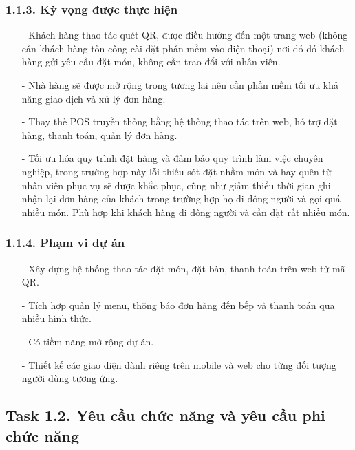 \documentclass[a4paper]{article}
\begin{document}
\subsubsection{1.1.3. Kỳ vọng được thực hiện}
\begin{itemize}
    \item[-] Khách hàng thao tác quét QR, được điều hướng đến một trang web (không cần khách hàng tốn công cài đặt phần mềm vào điện thoại) nơi đó đó khách hàng gửi yêu cầu đặt món, không cần trao đổi với nhân viên.
    \item[-] Nhà hàng sẽ được mở rộng trong tương lai nên cần phần mềm tối ưu khả năng giao dịch và xử lý đơn hàng.
    \item[-] Thay thế POS truyền thống bằng hệ thống thao tác trên web, hỗ trợ đặt hàng, thanh toán, quản lý đơn hàng.
    \item[-] Tối ưu hóa quy trình đặt hàng và đảm bảo quy trình làm việc chuyên nghiệp, trong trường hợp này lỗi thiếu sót đặt nhầm món và hay quên từ nhân viên phục vụ sẽ được khắc phục, cũng như giảm thiểu thời gian ghi nhận lại đơn hàng của khách trong trường hợp họ đi đông người và gọi quá nhiều món. Phù hợp khi khách hàng đi đông người và cần đặt rất nhiều món.
\end{itemize}

\subsubsection{1.1.4. Phạm vi dự án}
\begin{itemize}
    \item[-] Xây dựng hệ thống thao tác đặt món, đặt bàn, thanh toán trên web từ mã QR.
    \item[-] Tích hợp quản lý menu, thông báo đơn hàng đến bếp và thanh toán qua nhiều hình thức.
    \item[-] Có tiềm năng mở rộng dự án.
    \item[-] Thiết kế các giao diện dành riêng trên mobile và web cho từng đối tượng người dùng tương ứng.
\end{itemize}

\subsection{Task 1.2. Yêu cầu chức năng và yêu cầu phi chức năng}
\end{document}
